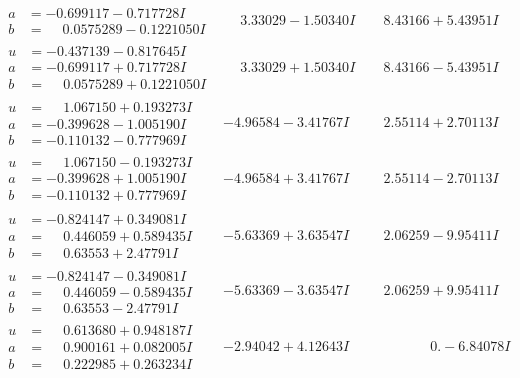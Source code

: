\documentclass[1p]{elsarticle_modified}
\theoremstyle{definition}
\begin{document}
$$\begin{array}{c|c|c}
\begin{aligned}
a &= -0.699117 - 0.717728 I \\
b &= \phantom{-}0.0575289 - 0.1221050 I\end{aligned}
 & \phantom{-}3.33029 - 1.50340 I & \phantom{-}8.43166 + 5.43951 I \\ \hline\begin{aligned}
u &= -0.437139 - 0.817645 I \\
a &= -0.699117 + 0.717728 I \\
b &= \phantom{-}0.0575289 + 0.1221050 I\end{aligned}
 & \phantom{-}3.33029 + 1.50340 I & \phantom{-}8.43166 - 5.43951 I \\ \hline\begin{aligned}
u &= \phantom{-}1.067150 + 0.193273 I \\
a &= -0.399628 - 1.005190 I \\
b &= -0.110132 - 0.777969 I\end{aligned}
 & -4.96584 - 3.41767 I & \phantom{-}2.55114 + 2.70113 I \\ \hline\begin{aligned}
u &= \phantom{-}1.067150 - 0.193273 I \\
a &= -0.399628 + 1.005190 I \\
b &= -0.110132 + 0.777969 I\end{aligned}
 & -4.96584 + 3.41767 I & \phantom{-}2.55114 - 2.70113 I \\ \hline\begin{aligned}
u &= -0.824147 + 0.349081 I \\
a &= \phantom{-}0.446059 + 0.589435 I \\
b &= \phantom{-}0.63553 + 2.47791 I\end{aligned}
 & -5.63369 + 3.63547 I & \phantom{-}2.06259 - 9.95411 I \\ \hline\begin{aligned}
u &= -0.824147 - 0.349081 I \\
a &= \phantom{-}0.446059 - 0.589435 I \\
b &= \phantom{-}0.63553 - 2.47791 I\end{aligned}
 & -5.63369 - 3.63547 I & \phantom{-}2.06259 + 9.95411 I \\ \hline\begin{aligned}
u &= \phantom{-}0.613680 + 0.948187 I \\
a &= \phantom{-}0.900161 + 0.082005 I \\
b &= \phantom{-}0.222985 + 0.263234 I\end{aligned}
 & -2.94042 + 4.12643 I & \phantom{-0.000000 } 0. - 6.84078 I \\ \hline\begin{aligned}

\end{aligned}
\end{array}$$
\end{document}
